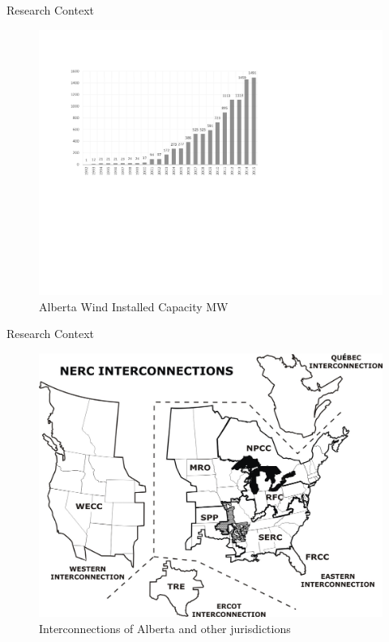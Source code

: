\documentclass[newPxFont,numfooter,progressbar,sectionpages]{beamer}
\begin{document}

\begin{frame}[c]{Research Context}


\begin{figure}
\centering
\includegraphics[width=0.9\linewidth]{"figure/abwindcapacitym"}
\caption{Alberta Wind Installed Capacity MW}
\label{fig:abwindcapacity}
\end{figure}



\end{frame}





\begin{frame}[c]{Research Context}


\begin{figure}
\centering
\includegraphics[width=0.8\linewidth]{"figure/Interconnection"}
\caption{Interconnections of Alberta and other jurisdictions}
\label{fig:Interconnection}
\end{figure}



\end{frame}
\end{document}
